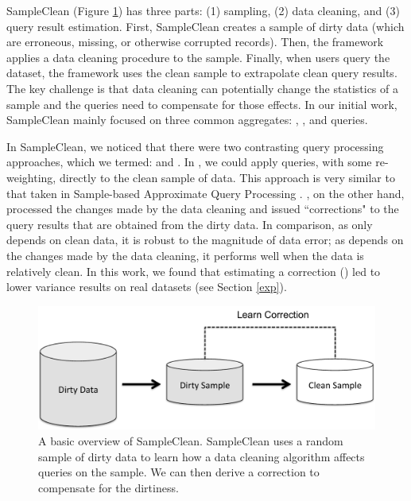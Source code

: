 SampleClean (Figure \ref{sc}) has three parts: (1) sampling, (2) data cleaning, and (3) query result estimation.
First, SampleClean creates a sample of dirty data (which are erroneous, missing, or otherwise corrupted records).
Then, the framework applies a data cleaning procedure to the sample.
Finally, when users query the dataset, the framework uses the clean sample to extrapolate clean query results.
The key challenge is that data cleaning can potentially change the statistics of a sample and the queries need to compensate for those effects.
In our initial work, SampleClean mainly focused on three common aggregates: \sumfunc, \avgfunc, and \countfunc queries.

In SampleClean, we noticed that there were two contrasting query processing approaches, which we termed: \rsc and \nsc.
In \rsc, we could apply queries, with some re-weighting, directly to the clean sample of data.
This approach is very similar to that taken in Sample-based Approximate Query Processing \cite{OlkenR86,AgarwalMPMMS13, joshi2008materialized}.
\nsc, on the other hand, processed the changes made by the data cleaning and issued ``corrections" to the query results that are obtained from the dirty data.
In comparison, as \rsc only depends on clean data, it is robust to the magnitude of data error; as \nsc depends on the changes made by the data cleaning, it performs well when the data is relatively clean.
In this work, we found that estimating a correction (\nsc) led to lower variance results on real datasets (see Section \ref{exp}). 

\begin{figure}[t] \vspace{-2em}
\centering
 \includegraphics[scale=0.30]{figs/sys-arch2.pdf} \vspace{-.25em}
 \caption{A basic overview of SampleClean. SampleClean uses a random sample of dirty data to learn how a data cleaning algorithm affects queries on the sample. We can then derive a correction to compensate for the dirtiness.\label{sc}}\vspace{-1.75em}
\end{figure}

